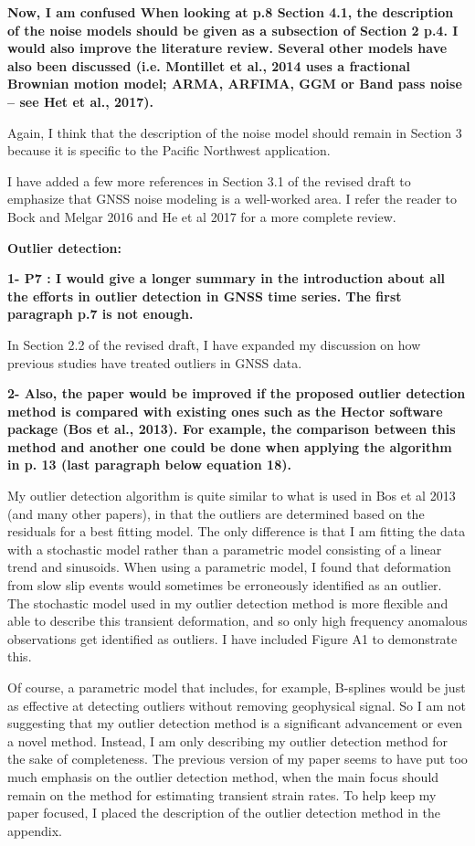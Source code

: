 \documentclass[10pt,a4paper]{letter}
\begin{document}
\begin{letter}{}
\textbf{Now, I am confused When looking at p.8 Section 4.1, the
description of the noise models should be given as a subsection of
Section 2 p.4. I would also improve the literature review. Several
other models have also been discussed (i.e. Montillet et al., 2014
uses a fractional Brownian motion model; ARMA, ARFIMA, GGM or Band
pass noise – see Het et al., 2017).}

Again, I think that the description of the noise model should remain
in Section 3 because it is specific to the Pacific Northwest
application. 

I have added a few more references in Section 3.1 of the revised draft
to emphasize that GNSS noise modeling is a well-worked area. I refer
the reader to Bock and Melgar 2016 and He et al 2017 for a more
complete review.

\textbf{Outlier detection:}

\textbf{1- P7 : I would give a longer summary in the introduction about all
the efforts in outlier detection in GNSS time series. The first
paragraph p.7 is not enough.}

In Section 2.2 of the revised draft, I have expanded my discussion on
how previous studies have treated outliers in GNSS data.

\textbf{2- Also, the paper would be improved if the proposed outlier detection
method is compared with existing ones such as the Hector software
package (Bos et al., 2013). For example, the comparison between this
method and another one could be done when applying the algorithm in p.
13 (last paragraph below equation 18).}

My outlier detection algorithm is quite similar to what is used in Bos
et al 2013 (and many other papers), in that the outliers are
determined based on the residuals for a best fitting model. The only
difference is that I am fitting the data with a stochastic model
rather than a parametric model consisting of a linear trend and
sinusoids. When using a parametric model, I found that deformation
from slow slip events would sometimes be erroneously identified as an
outlier. The stochastic model used in my outlier detection method is
more flexible and able to describe this transient deformation, and so
only high frequency anomalous observations get identified as outliers.
I have included Figure A1 to demonstrate this.

Of course, a parametric model that includes, for example, B-splines
would be just as effective at detecting outliers without removing
geophysical signal. So I am not suggesting that my outlier detection
method is a significant advancement or even a novel method. Instead, I
am only describing my outlier detection method for the sake of
completeness. The previous version of my paper seems to have put too
much emphasis on the outlier detection method, when the main focus
should remain on the method for estimating transient strain rates. To
help keep my paper focused, I placed the description of the outlier
detection method in the appendix.


\end{letter}
\end{document}
